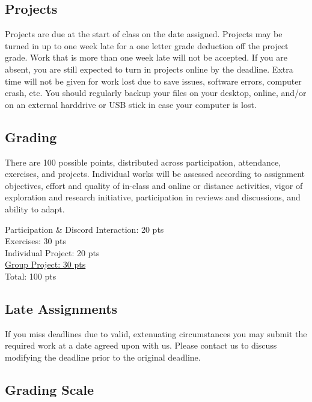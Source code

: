 \subsection{Projects}

Projects are due at the start of class on the date assigned. Projects may be turned in up to one week late for a one letter grade deduction off the project grade. Work that is more than one week late will not be accepted. If you are absent, you are still expected to turn in projects online by the deadline. Extra time will not be given for work lost due to save issues, software errors, computer crash, etc. You should regularly backup your files on your desktop, online, and/or on an external harddrive or USB stick in case your computer is lost.

\subsection{Grading}

There are 100 possible points, distributed across participation, attendance, exercises, and projects. Individual works will be assessed according to assignment objectives, effort and quality of in-class and online or distance activities, vigor of exploration and research initiative, participation in reviews and discussions, and ability to adapt.

\hspace*{1em} Participation \& Discord Interaction: 20 pts\\
\hspace*{1em} Exercises: 30 pts\\
\hspace*{1em} Individual Project: 20 pts\\
\hspace*{1em} \ul{Group Project: 30 pts}\\
\hspace*{1em} Total: 100 pts

\subsection{Late Assignments}

If you miss deadlines due to valid, extenuating circumstances you may submit the required work at a date agreed upon with us. Please contact us to discuss modifying the deadline prior to the original deadline.

\subsection{Grading Scale}

